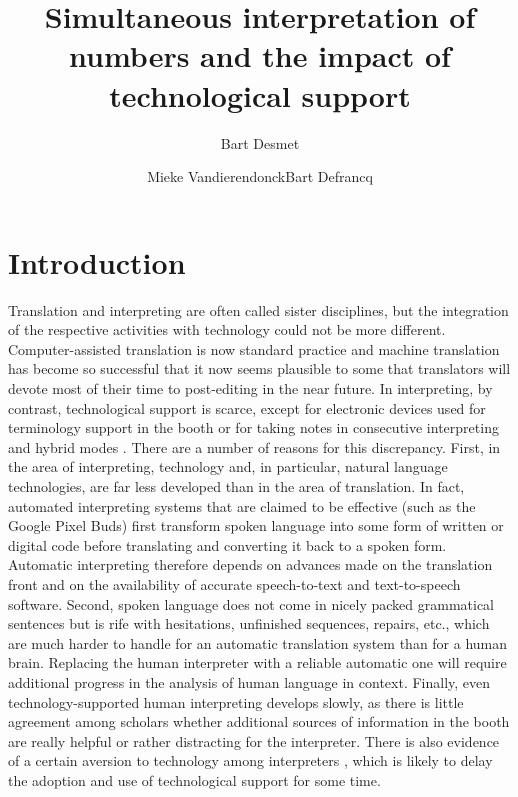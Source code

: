 \documentclass[output=paper]{langsci/langscibook}
\title{Simultaneous interpretation of numbers and the impact of technological support}
\author{Bart Desmet\affiliation{Ghent University}\and Mieke Vandierendonck\affiliation{Ghent University}\lastand Bart Defrancq\affiliation{Ghent University}}
\begin{document}

 

 
\section{Introduction}
Translation and interpreting are often called sister disciplines, but the integration of the respective activities with technology could not be more different. Computer-assisted translation is now standard practice and machine translation has become so successful that it now seems plausible to some that translators will devote most of their time to post-editing in the near future. In interpreting, by contrast, technological support is scarce, except for electronic devices used for terminology support in the booth \citep{Fantinuoli2012} or for taking notes in consecutive interpreting and hybrid modes \citep{Orlando2014,Orlando2016,Goldsmith2017}. There are a number of reasons for this discrepancy. First, in the area of interpreting, technology and, in particular, natural language technologies, are far less developed than in the area of translation. In fact, automated interpreting systems that are claimed to be effective (such as the Google Pixel Buds) first transform spoken language into some form of written or digital code before translating and converting it back to a spoken form. Automatic interpreting therefore depends on advances made on the translation front and on the availability of accurate speech-to-text and text-to-speech software. Second, spoken language does not come in nicely packed grammatical sentences but is rife with hesitations, unfinished sequences, repairs, etc., which are much harder to handle for an automatic translation system than for a human brain. Replacing the human interpreter with a reliable automatic one will require additional progress in the analysis of human language in context. Finally, even technology-supported human interpreting develops slowly, as there is little agreement among scholars whether additional sources of information in the booth are really helpful or rather distracting for the interpreter. There is also evidence of a certain aversion to technology among interpreters \citep{CorpasPastor2016}, which is likely to delay the adoption and use of technological support for some time. 
\end{document}

